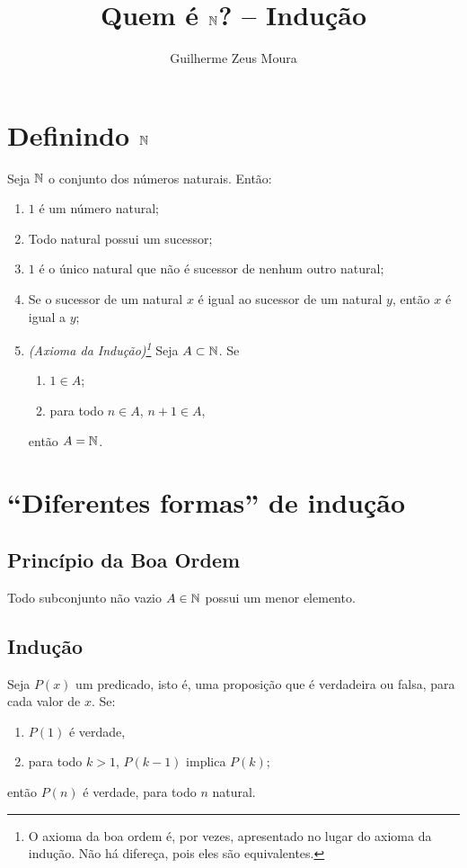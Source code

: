 \documentclass[10pt, a4paper]{article}
\title{Quem é $\mathbb{N}$? -- Indução}
\author{Guilherme Zeus Moura}
\begin{document}
	
	\zeustitle

	\section[Definindo os naturais]{Definindo $\mathbb{N}$}

	\begin{defn} Seja $\mathbb{N}$ o conjunto dos números naturais. Então:
		\begin{enumerate}[label = \textbf{\roman*.}]
			\item $1$ é um número natural;
			\item Todo natural possui um sucessor;
			\item $1$ é o único natural que não é sucessor de nenhum outro natural;
			\item Se o sucessor de um natural $x$ é igual ao sucessor de um natural $y$, então $x$ é igual a $y$;
			\item \emph{(Axioma da Indução)\footnote{O axioma da boa ordem é, por vezes, apresentado no lugar do axioma da indução. Não há difereça, pois eles são equivalentes.}}	
				Seja $A \subset \mathbb{N}$. Se
				\begin{enumerate}[label = --]
					\item $1 \in A$;
					\item para todo $n \in A$, $n+1 \in A$,
				\end{enumerate}
				então $A = \mathbb{N}$. 
		\end{enumerate}
	\end{defn}

	\section{``Diferentes formas'' de indução}

	\subsection{Princípio da Boa Ordem}

	Todo subconjunto não vazio $A \in \mathbb{N}$ possui um menor elemento.

	\subsection{Indução}

	Seja $P(x)$ um predicado, isto é, uma proposição que é verdadeira ou falsa, para cada valor de $x$. Se:
	\begin{enumerate}[label = --]
		\item $P(1)$ é verdade,
		\item para todo $k > 1$, $P(k-1)$ implica $P(k)$;
	\end{enumerate}
	então $P(n)$ é verdade, para todo $n$ natural.
\end{document}
